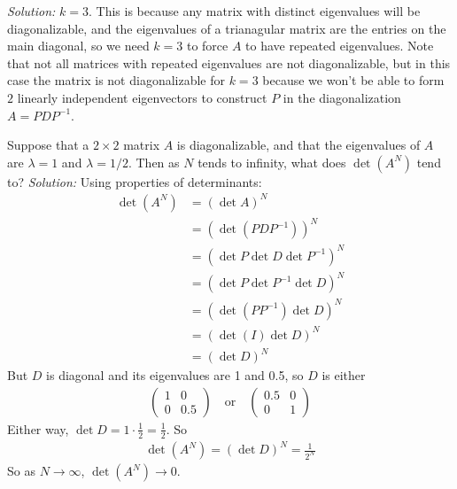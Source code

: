\begin{parts}
        \ifnum {} {\color{DarkBlue} \textit{Solution:} $k=3$. This is because any matrix with distinct eigenvalues will be diagonalizable, and the eigenvalues of a trianagular matrix are the entries on the main diagonal, so we need $k = 3$ to force $A$ to have repeated eigenvalues. Note that not all matrices with repeated eigenvalues are not diagonalizable, but in this case the matrix is not diagonalizable for $k=3$ because  we won't be able to form $2$ linearly independent eigenvectors to construct $P$ in the diagonalization $A = PDP^{-1}$. } \fi    
    \fi 

    
    \ifnum {}
        Suppose that a $2\times 2$ matrix $A$ is diagonalizable, and that the eigenvalues of $A$ are $\lambda = 1$ and $\lambda= 1/2$. Then as $N$ tends to infinity, what does $\det(A^N)$ tend to? \framebox{\strut\hspace{1cm}}
        \ifnum {} {\color{DarkBlue} \textit{Solution:} Using properties of determinants:
        \begin{align}
            \det(A^N) &= (\det A)^N \\
            &= (\det (PDP^{-1}))^N \\
            &= (\det P \det D \det P^{-1})^N\\
            &= (\det P  \det P^{-1} \det D)^N\\
            &= (\det (P P^{-1}) \det D)^N\\
            &= (\det (I) \det D)^N\\
            &= (\det D)^N
        \end{align}
        But $D$ is diagonal and its eigenvalues are 1 and 0.5, so $D$ is either 
        \begin{align}
            \begin{pmatrix} 1&0\\0&0.5\end{pmatrix} \quad \text{or} \quad \begin{pmatrix} 0.5&0\\0&1\end{pmatrix}
        \end{align}        
        Either way, $\det D = 1 \cdot \frac{1}{2} = \frac12$. So 
        \begin{align}
            \det(A^N) = (\det D)^N = \frac{1}{2^N}
        \end{align}
        So as $N \to \infty$,  $\det(A^N) \to 0$. 
        } \fi    
    \fi 


\end{parts}
